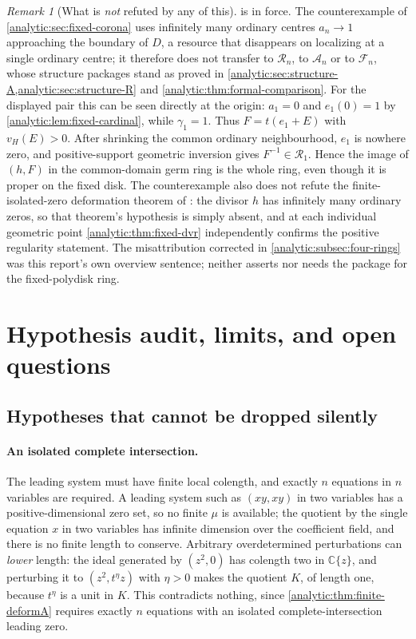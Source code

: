 \documentclass[11pt,letterpaper]{article}
\theoremstyle{definition}
\theoremstyle{remark}
\newtheorem{remark}[theorem]{Remark}
\newcommand{\C}{\mathbb C}
\newcommand{\A}{\mathscr A}
\newcommand{\RR}{\mathscr R}
\newcommand{\FF}{\mathscr F}
\newcommand{\vH}{v_{\!H}}
\numberwithin{equation}{section}
\begin{document}
\begin{remark}[What is \emph{not} refuted by any of this]
\label{analytic:rem:fixed-not-transferred}
 is in force. The counterexample of
\cref{analytic:sec:fixed-corona} uses infinitely many ordinary centres
$a_n\to1$ approaching the boundary of $D$, a resource that disappears on
localizing at a single ordinary centre; it therefore does not transfer to
$\RR_n$, to $\A_n$ or to $\FF_n$, whose structure packages stand as proved
in \cref{analytic:sec:structure-A,analytic:sec:structure-R} and
\cref{analytic:thm:formal-comparison}. For the displayed pair this can be seen
directly at the origin: $a_1=0$ and $e_1(0)=1$ by
\cref{analytic:lem:fixed-cardinal}, while $\gamma_1=1$. Thus
$F=t(e_1+E)$ with $\vH(E)>0$. After shrinking the common ordinary
neighbourhood, $e_1$ is nowhere zero, and positive-support geometric
inversion gives $F^{-1}\in\RR_1$. Hence the image of $(h,F)$ in the
common-domain germ ring is the whole ring, even though it is proper on the
fixed disk. The counterexample also does not refute the
finite-isolated-zero deformation theorem of \cite{FiniteDeformations}: the
divisor $h$ has infinitely many ordinary zeros, so that theorem's
hypothesis is simply absent, and at each individual geometric point
\cref{analytic:thm:fixed-dvr} independently confirms the positive
regularity statement. The misattribution corrected in
\cref{analytic:subsec:four-rings} was this report's own overview sentence;
\cite{FiniteDeformations} neither asserts nor needs the package for the
fixed-polydisk ring.
\end{remark}

\section{Hypothesis audit, limits, and open questions}
\label{analytic:sec:limits}

\subsection{Hypotheses that cannot be dropped silently}
\label{analytic:subsec:hypotheses}
\paragraph{An isolated complete intersection.}
The leading system must have finite local colength, and exactly $n$
equations in $n$ variables are required. A leading system such as
$(xy,xy)$ in two variables has a positive-dimensional zero set, so no finite
$\mu$ is available; the quotient by the single equation $x$ in two variables
has infinite dimension over the coefficient field, and there is no finite
length to conserve. Arbitrary overdetermined perturbations can \emph{lower}
length: the ideal generated by $(z^2,0)$ has colength two in $\C\{z\}$, and
perturbing it to $(z^2,t^\eta z)$ with $\eta>0$ makes the quotient $K$, of
length one, because $t^\eta$ is a unit in $K$. This contradicts nothing,
since \cref{analytic:thm:finite-deformA} requires exactly $n$ equations with
an isolated complete-intersection leading zero.
\end{document}
